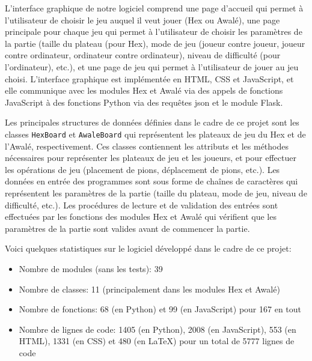 L'interface graphique de notre logiciel comprend une page d'accueil qui permet à l'utilisateur
de choisir le jeu auquel il veut jouer (Hex ou Awalé), une page principale pour chaque jeu
qui permet à l'utilisateur de choisir les paramètres de la partie (taille du plateau (pour Hex),
mode de jeu (joueur contre joueur, joueur contre ordinateur, ordinateur contre ordinateur),
niveau de difficulté (pour l'ordinateur), etc.), et une page de jeu qui permet à l'utilisateur
de jouer au jeu choisi. L'interface graphique est implémentée en HTML, CSS et JavaScript, et
elle communique avec les modules Hex et Awalé via des appels de fonctions JavaScript à des
fonctions Python via des requêtes json et le module Flask.

Les principales structures de données définies dans le cadre de ce projet sont les classes
\texttt{HexBoard} et \texttt{AwaleBoard} qui représentent les plateaux de jeu du Hex et de
l'Awalé, respectivement. Ces classes contiennent les attributs et les méthodes nécessaires
pour représenter les plateaux de jeu et les joueurs, et pour effectuer les opérations de jeu
(placement de pions, déplacement de pions, etc.). Les données en entrée des programmes sont
sous forme de chaînes de caractères qui représentent les paramètres de la partie (taille du
plateau, mode de jeu, niveau de difficulté, etc.). Les procédures de lecture et de validation
des entrées sont effectuées par les fonctions des modules Hex et Awalé qui vérifient que les
paramètres de la partie sont valides avant de commencer la partie.


Voici quelques statistiques sur le logiciel développé dans le cadre de ce projet:
\begin{itemize}
    \item Nombre de modules (sans les tests): 39
    \item Nombre de classes: 11 (principalement dans les modules Hex et Awalé)
    \item Nombre de fonctions: 68 (en Python) et 99 (en JavaScript) pour 167 en tout
    \item Nombre de lignes de code: 1405 (en Python), 2008 (en JavaScript), 553 (en HTML), 1331 (en CSS)
    et 480 (en \LaTeX) pour un total de 5777 lignes de code
\end{itemize}